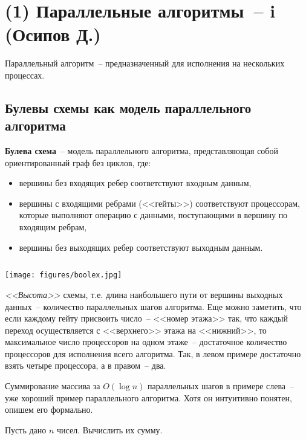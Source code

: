 \section{(1) Параллельные алгоритмы~-- i (Осипов Д.)}

\begin{definition*}
    Параллельный алгоритм~-- предназначенный для исполнения на нескольких процессах.
\end{definition*}
\subsection{Булевы схемы как модель параллельного алгоритма}
\begin{definition*}
	{\bfseries Булева схема}~-- модель параллельного алгоритма, представляющая собой ориентированный граф без циклов, где:
\begin{itemize}
    \item вершины без входящих ребер соответствуют входным данным,
    \item вершины с входящими ребрами (<<гейты>>) соответствуют процессорам, которые выполняют операцию с данными, поступающими в вершину по входящим ребрам,
    \item вершины без выходящих ребер соответствуют выходным данным.
\end{itemize}
\end{definition*}
\begin{example*}
$ $
    \begin{center}
    \texttt{[image: figures/boolex.jpg]}
    \end{center}
\end{example*}

\textit{<<Высота>>} схемы, т.е. длина наибольшего пути от вершины выходных данных~-- количество параллельных шагов алгоритма. Еще можно заметить, что если каждому гейту присвоить число~-- <<номер этажа>> так, что каждый переход осуществляется с <<верхнего>> этажа на <<нижний>>, то максимальное число процессоров на одном этаже~-- достаточное количество процессоров для исполнения всего алгоритма. Так, в левом примере достаточно взять четыре процессора, а в правом~-- два.

Суммирование массива за $O(\log n)$ параллельных шагов в примере слева~-- уже хороший пример параллельного алгоритма. Хотя он интуитивно понятен, опишем его формально.

\begin{problem*}
	Пусть дано $n$ чисел. Вычислить их сумму.
\end{problem*}

